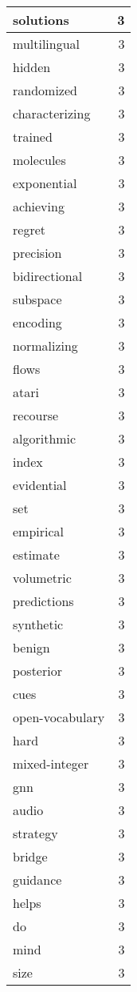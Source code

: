 \begin{table}[h]
\begin{tabular}{|l|r|}
\hline
solutions & 3 \\
\hline
multilingual & 3 \\
\hline
hidden & 3 \\
\hline
randomized & 3 \\
\hline
characterizing & 3 \\
\hline
trained & 3 \\
\hline
molecules & 3 \\
\hline
exponential & 3 \\
\hline
achieving & 3 \\
\hline
regret & 3 \\
\hline
precision & 3 \\
\hline
bidirectional & 3 \\
\hline
subspace & 3 \\
\hline
encoding & 3 \\
\hline
normalizing & 3 \\
\hline
flows & 3 \\
\hline
atari & 3 \\
\hline
recourse & 3 \\
\hline
algorithmic & 3 \\
\hline
index & 3 \\
\hline
evidential & 3 \\
\hline
set & 3 \\
\hline
empirical & 3 \\
\hline
estimate & 3 \\
\hline
volumetric & 3 \\
\hline
predictions & 3 \\
\hline
synthetic & 3 \\
\hline
benign & 3 \\
\hline
posterior & 3 \\
\hline
cues & 3 \\
\hline
open-vocabulary & 3 \\
\hline
hard & 3 \\
\hline
mixed-integer & 3 \\
\hline
gnn & 3 \\
\hline
audio & 3 \\
\hline
strategy & 3 \\
\hline
bridge & 3 \\
\hline
guidance & 3 \\
\hline
helps & 3 \\
\hline
do & 3 \\
\hline
mind & 3 \\
\hline
size & 3 \\

\end{tabular}
\end{table}
